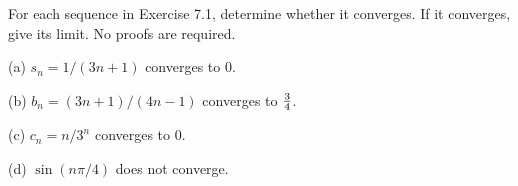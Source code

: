 
For each sequence in Exercise 7.1, determine whether it converges.
If it converges, give its limit.
No proofs are required.

\medskip
(a) $s_n=1/(3n+1)$ converges to 0.

\medskip
(b) $b_n=(3n+1)/(4n-1)$ converges to $3\over4$.

\medskip
(c) $c_n=n/3^n$ converges to 0.

\medskip
(d) $\sin(n\pi/4)$ does not converge.
